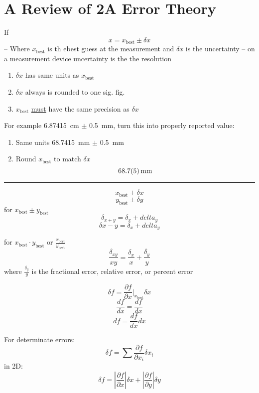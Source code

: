 \documentclass{article}
\begin{document}
\newcommand{\hr}{\par\noindent\rule{\textwidth}{0.4pt}}

\section{A Review of 2A Error Theory}

If
$$ x = x_{\text{best}} \pm \delta x $$
– Where $ x_{\text{best}} $ is th ebest guess at the measurement and $ \delta x $ is the uncertainty – on a measurement device uncertainty is the the resolution

\begin{enumerate}[label=\text{Rule} \arabic*:]
    \item $ \delta x $ has same units as $ x_{\text{best}} $
    \item $ \delta x $ always is rounded to one sig. fig.
    \item $ x_\text{best} $ \underline{must} have the same precision as $ \delta x $
\end{enumerate}
For example \SI{6.87415}{\cm} $ \pm $ \SI{0.5}{\mm}, turn this into properly reported value:
\begin{enumerate}[label=\text{Step} \arabic*:]
    \item Same units \SI{68.7415}{\mm} $ \pm $ \SI{0.5}{\mm}
    \item Round $ x_{\text{best}} $ to match $ \delta x $
        $$ \SI{68.7 \pm 0.5}{\mm} $$
\end{enumerate}

\hr

$$ x_{\text{best}} \pm \delta x $$
$$ y_{\text{best}} \pm \delta y $$
for $ x_{\text{best}} \pm y_{\text{best}} $
$$ \delta_{x + y} = \delta_x + delta_y $$
$$ \delta{x - y} = \delta_x + delta_y $$

for $ x_{\text{best}} \cdot y_{\text{best}} $ or $ \frac{x_{\text{best}}}{y_{\text{best}}} $
$$ \frac{\delta_{xy}}{xy} = \frac{\delta_x}{x} + \frac{\delta_y}{y} $$
where $ \frac{\delta_y}{y} $ is the fractional error, relative error, or percent error

$$ \delta f = \frac{\partial f}{\partial x} \Biggr|_{x_{\text{best}}} \delta x $$
$$ \frac{df}{dx} = \frac{df}{dx} $$
$$ df = \frac{df}{dx}dx $$

For determinate errors:
$$ \delta f = \sum \frac{\partial f}{\partial x_i}\delta{x_i} $$
in 2D:
$$ \delta f = \left| \frac{\partial f}{\partial x} \right| \delta x + \left| \frac{\partial f}{\partial y} \right| \delta y $$
\end{document}
